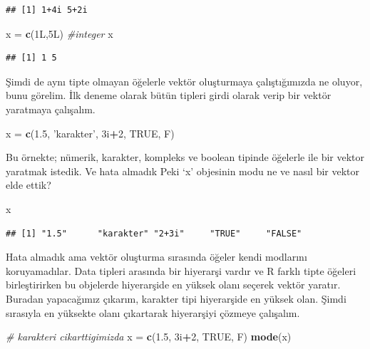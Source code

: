 \documentclass[]{book}
\newenvironment{Shaded}{\begin{snugshade}}{\end{snugshade}}
\newcommand{\CommentTok}[1]{\textcolor[rgb]{0.56,0.35,0.01}{\textit{#1}}}
\newcommand{\DecValTok}[1]{\textcolor[rgb]{0.00,0.00,0.81}{#1}}
\newcommand{\FloatTok}[1]{\textcolor[rgb]{0.00,0.00,0.81}{#1}}
\newcommand{\KeywordTok}[1]{\textcolor[rgb]{0.13,0.29,0.53}{\textbf{#1}}}
\newcommand{\NormalTok}[1]{#1}
\newcommand{\OperatorTok}[1]{\textcolor[rgb]{0.81,0.36,0.00}{\textbf{#1}}}
\newcommand{\OtherTok}[1]{\textcolor[rgb]{0.56,0.35,0.01}{#1}}
\newcommand{\StringTok}[1]{\textcolor[rgb]{0.31,0.60,0.02}{#1}}
\begin{document}
\begin{verbatim}
## [1] 1+4i 5+2i
\end{verbatim}

\begin{Shaded}
\begin{Highlighting}[]
\NormalTok{x =}\StringTok{ }\KeywordTok{c}\NormalTok{(1L,5L) }\CommentTok{#integer}
\NormalTok{x}
\end{Highlighting}
\end{Shaded}

\begin{verbatim}
## [1] 1 5
\end{verbatim}

Şimdi de aynı tipte olmayan öğelerle vektör oluşturmaya çalıştığımızda
ne oluyor, bunu görelim. İlk deneme olarak bütün tipleri girdi olarak
verip bir vektör yaratmaya çalışalım.

\begin{Shaded}
\begin{Highlighting}[]
\NormalTok{x =}\StringTok{ }\KeywordTok{c}\NormalTok{(}\FloatTok{1.5}\NormalTok{, }\StringTok{'karakter'}\NormalTok{, 3i}\OperatorTok{+}\DecValTok{2}\NormalTok{, }\OtherTok{TRUE}\NormalTok{, F)}
\end{Highlighting}
\end{Shaded}

Bu örnekte; nümerik, karakter, kompleks ve boolean tipinde öğelerle ile
bir vektor yaratmak istedik. Ve hata almadık Peki `x' objesinin modu ne
ve nasıl bir vektor elde ettik?

\begin{Shaded}
\begin{Highlighting}[]
\NormalTok{x}
\end{Highlighting}
\end{Shaded}

\begin{verbatim}
## [1] "1.5"      "karakter" "2+3i"     "TRUE"     "FALSE"
\end{verbatim}

Hata almadık ama vektör oluşturma sırasında öğeler kendi modlarını
koruyamadılar. Data tipleri arasında bir hiyerarşi vardır ve R farklı
tipte öğeleri birleştirirken bu objelerde hiyerarşide en yüksek olanı
seçerek vektör yaratır. Buradan yapacağımız çıkarım, karakter tipi
hiyerarşide en yüksek olan. Şimdi sırasıyla en yüksekte olanı çıkartarak
hiyerarşiyi çözmeye çalışalım.

\begin{Shaded}
\begin{Highlighting}[]
\CommentTok{# karakteri cikarttigimizda}
\NormalTok{x =}\StringTok{ }\KeywordTok{c}\NormalTok{(}\FloatTok{1.5}\NormalTok{, 3i}\OperatorTok{+}\DecValTok{2}\NormalTok{, }\OtherTok{TRUE}\NormalTok{, F)}
\KeywordTok{mode}\NormalTok{(x)}
\end{Highlighting}
\end{Shaded}
\end{document}
